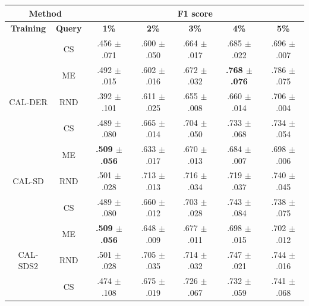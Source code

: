 \begin{table}[htbp]
\centering

\begin{tabular*}{\linewidth}{c|c|@{\extracolsep{\fill}}ccccc}
\toprule
\multicolumn{2}{c|}{\textbf{Method}} & \multicolumn{5}{c}{\textbf{F1 score}} \\
\midrule
\textbf{Training} & \textbf{Query} & \textbf{1\%} & \textbf{2\%} & \textbf{3\%} & \textbf{4\%} & \textbf{5\%}\\
\midrule
 & CS & .456 $\pm$ {\small .071} & .600 $\pm$ {\small .050} & .664 $\pm$ {\small .017} & .685 $\pm$ {\small .022} & .696 $\pm$ {\small .007}\\

 & ME & .492 $\pm$ {\small .015} & .602 $\pm$ {\small .016} & .672 $\pm$ {\small .032} & \textbf{.768 $\pm$ {\small .076}} & .786 $\pm$ {\small .075}\\

\multirow{-3}{*}{\raggedright\arraybackslash CAL-DER} & RND & .392 $\pm$ {\small .101} & .611 $\pm$ {\small .025} & .655 $\pm$ {\small .008} & .660 $\pm$ {\small .014} & .706 $\pm$ {\small .004}\\
\midrule
 & CS & .489 $\pm$ {\small .080} & .665 $\pm$ {\small .014} & .704 $\pm$ {\small .050} & .733 $\pm$ {\small .068} & .734 $\pm$ {\small .054}\\

 & ME & \textbf{.509 $\pm$ {\small .056}} & .633 $\pm$ {\small .017} & .670 $\pm$ {\small .013} & .684 $\pm$ {\small .007} & .698 $\pm$ {\small .006}\\

\multirow{-3}{*}{\raggedright\arraybackslash CAL-SD} & RND & .501 $\pm$ {\small .028} & .713 $\pm$ {\small .013} & .716 $\pm$ {\small .034} & .719 $\pm$ {\small .037} & .740 $\pm$ {\small .045}\\
\midrule
 & CS & .489 $\pm$ {\small .080} & .660 $\pm$ {\small .012} & .703 $\pm$ {\small .028} & .743 $\pm$ {\small .084} & .738 $\pm$ {\small .075}\\

 & ME & \textbf{.509 $\pm$ {\small .056}} & .648 $\pm$ {\small .009} & .677 $\pm$ {\small .011} & .698 $\pm$ {\small .015} & .702 $\pm$ {\small .012}\\

\multirow{-3}{*}{\raggedright\arraybackslash CAL-SDS2} & RND & .501 $\pm$ {\small .028} & .705 $\pm$ {\small .035} & .714 $\pm$ {\small .032} & .747 $\pm$ {\small .021} & .744 $\pm$ {\small .016}\\
\midrule
 & CS & .474 $\pm$ {\small .108} & .675 $\pm$ {\small .019} & .726 $\pm$ {\small .067} & .732 $\pm$ {\small .059} & .741 $\pm$ {\small .068}\\


\end{tabular*}
\end{table}
